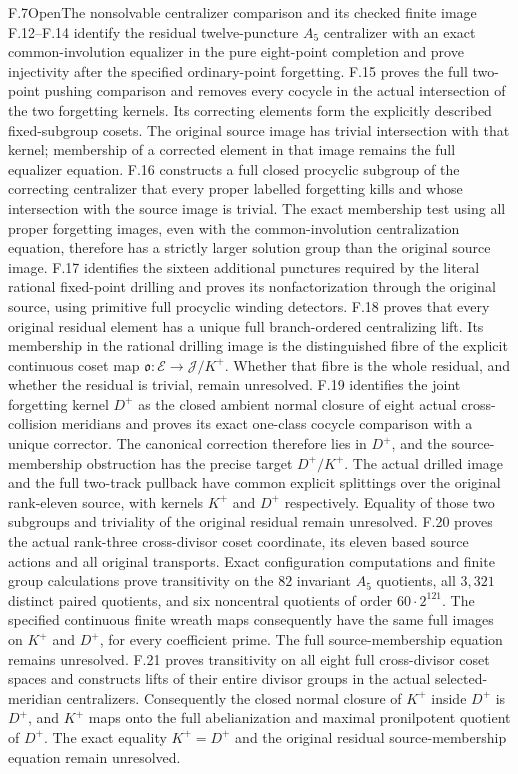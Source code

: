 \begin{claim}{F.7}{Open}{The nonsolvable centralizer comparison and its checked finite image}
F.12--F.14 identify the residual twelve-puncture $A_5$ centralizer with an exact common-involution equalizer in the pure eight-point completion and prove injectivity after the specified ordinary-point forgetting. F.15 proves the full two-point pushing comparison and removes every cocycle in the actual intersection of the two forgetting kernels. Its correcting elements form the explicitly described fixed-subgroup cosets. The original source image has trivial intersection with that kernel; membership of a corrected element in that image remains the full equalizer equation. F.16 constructs a full closed procyclic subgroup of the correcting centralizer that every proper labelled forgetting kills and whose intersection with the source image is trivial. The exact membership test using all proper forgetting images, even with the common-involution centralization equation, therefore has a strictly larger solution group than the original source image. F.17 identifies the sixteen additional punctures required by the literal rational fixed-point drilling and proves its nonfactorization through the original source, using primitive full procyclic winding detectors. F.18 proves that every original residual element has a unique full branch-ordered centralizing lift. Its membership in the rational drilling image is the distinguished fibre of the explicit continuous coset map $\mathfrak o:\mathcal E\to\mathcal J/K^+$. Whether that fibre is the whole residual, and whether the residual is trivial, remain unresolved.
F.19 identifies the joint forgetting kernel $D^+$ as the closed ambient normal closure of eight actual cross-collision meridians and proves its exact one-class cocycle comparison with a unique corrector. The canonical correction therefore lies in $D^+$, and the source-membership obstruction has the precise target $D^+/K^+$. The actual drilled image and the full two-track pullback have common explicit splittings over the original rank-eleven source, with kernels $K^+$ and $D^+$ respectively. Equality of those two subgroups and triviality of the original residual remain unresolved.
F.20 proves the actual rank-three cross-divisor coset coordinate, its eleven based source actions and all original transports. Exact configuration computations and finite group calculations prove transitivity on the $82$ invariant $A_5$ quotients, all $3,321$ distinct paired quotients, and six noncentral quotients of order $60\cdot2^{121}$. The specified continuous finite wreath maps consequently have the same full images on $K^+$ and $D^+$, for every coefficient prime. The full source-membership equation remains unresolved.
F.21 proves transitivity on all eight full cross-divisor coset spaces and constructs lifts of their entire divisor groups in the actual selected-meridian centralizers. Consequently the closed normal closure of $K^+$ inside $D^+$ is $D^+$, and $K^+$ maps onto the full abelianization and maximal pronilpotent quotient of $D^+$. The exact equality $K^+=D^+$ and the original residual source-membership equation remain unresolved.
\end{claim}
